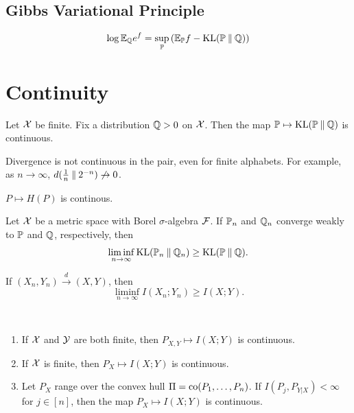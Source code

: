 \subsection{Gibbs Variational Principle}

\begin{theorem}\label{thm:gibbs-variational-principle}
    \[\log \mathbb{E}_{\mathbb{Q}} e^f=\sup_{\mathbb{P}} \left(\mathbb{E}_{\mathbb{P}} f-\operatorname{KL}(\mathbb{P}\mathbin{\|}\mathbb{Q})\right)\]
\end{theorem}



\section{Continuity}


\begin{proposition}
    Let $\mathcal{X}$ be finite. Fix a distribution $\mathbb{Q}>0$ on $\mathcal{X}$.
    Then the map $\mathbb{P}\mapsto \operatorname{KL}(\mathbb{P}\mathbin{\|} \mathbb{Q})$ is continuous.
\end{proposition}
\begin{remark}
    Divergence is not continuous in the pair, even for finite alphabets.
For example, as $n\to\infty$, $d(\frac{1}{n}\mathbin{\|} 2^{-n})\not\to 0$.
\end{remark}
\begin{corollary}
    $P\mapsto H(P)$ is continous.
\end{corollary}

\begin{theorem}
    Let $\mathcal{X}$ be a metric space with Borel $\sigma$-algebra $\mathcal{F}$.
    If $\mathbb{P}_n$ and $\mathbb{Q}_n$ converge weakly to $\mathbb{P}$ and $\mathbb{Q}$, respectively, then 
    \[\liminf_{n\to\infty} \operatorname{KL}(\mathbb{P}_n\mathbin{\|}\mathbb{Q}_n)\geq \operatorname{KL}(\mathbb{P}\mathbin{\|} \mathbb{Q}).\]
\end{theorem}
\begin{corollary}
    If $(X_n,Y_n)\stackrel{d}{\to}(X,Y)$, then 
    \[\liminf_{n\to\infty} I(X_n;Y_n)\geq I(X;Y).\]
\end{corollary}

\begin{proposition}
    \
    \begin{enumerate}[label=(\roman*)]
        \item If $\mathcal{X}$ and $\mathcal{Y}$ are both finite, then $P_{X,Y}\mapsto I(X;Y)$ is continuous.
        \item If $\mathcal{X}$ is finite, then $P_X\mapsto I(X;Y)$ is continuous.
        \item Let $P_X$ range over the convex hull $\Pi =\operatorname{co}(P_1,\dots,P_n)$.
        If $I(P_j,P_{Y|X})<\infty$ for $j\in [n]$, then the map $P_X\mapsto I(X;Y)$ is continuous.
    \end{enumerate}
\end{proposition}

